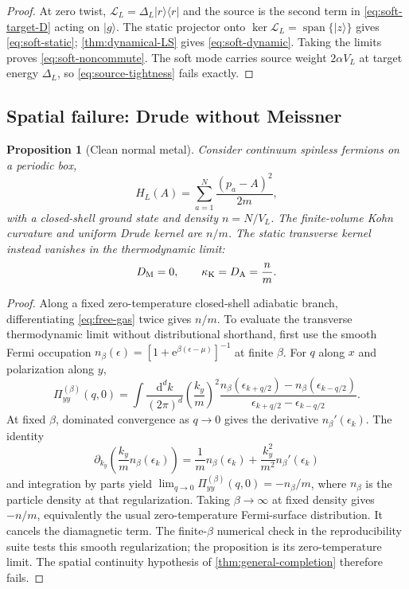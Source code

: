 \documentclass[11pt]{article}
\newtheorem{proposition}[theorem]{Proposition}
\theoremstyle{definition}
\theoremstyle{remark}
\newcommand{\cL}{\mathcal L}
\newcommand{\Span}{\operatorname{span}}
\newcommand{\dd}{\mathrm d}
\newcommand{\e}{\mathrm e}
\newcommand{\ket}[1]{\lvert #1\rangle}
\newcommand{\bra}[1]{\langle #1\rvert}
\begin{document}
\begin{proof}
At zero twist,
$\cL_L=\Delta_L\ket r\bra r$ and the source is the second term in
\eqref{eq:soft-target-D} acting on $\ket g$.  The static projector onto $\ker\cL_L=\Span\{\ket z\}$
gives \eqref{eq:soft-static}; \cref{thm:dynamical-LS} gives \eqref{eq:soft-dynamic}.  Taking the limits
proves \eqref{eq:soft-noncommute}.  The soft mode carries source weight $2\alpha V_L$ at target energy
$\Delta_L$, so \eqref{eq:source-tightness} fails exactly.
\end{proof}

\subsection{Spatial failure: Drude without Meissner}

\begin{proposition}[Clean normal metal]
\label{prop:free-gas}
Consider continuum spinless fermions on a periodic box,
\begin{equation}
 H_L(A)=\sum_{a=1}^N\frac{(p_a-A)^2}{2m},
 \label{eq:free-gas}
\end{equation}
with a closed-shell ground state and density $n=N/V_L$.  The finite-volume Kohn curvature and uniform
Drude kernel are $n/m$.  The static transverse kernel instead vanishes in the thermodynamic limit:
\begin{equation}
 D_{\rm M}=0,
 \qquad
 \kappa_{\rm K}=D_{\rm A}=\frac nm.
 \label{eq:free-gas-result}
\end{equation}
\end{proposition}

\begin{proof}
Along a fixed zero-temperature closed-shell adiabatic branch, differentiating \eqref{eq:free-gas} twice
gives $n/m$.  To evaluate the transverse thermodynamic limit without distributional shorthand, first use
the smooth Fermi occupation $n_\beta(\epsilon)=[1+\e^{\beta(\epsilon-\mu)}]^{-1}$ at finite
$\beta$.  For $q$ along $x$ and polarization along $y$,
\begin{equation}
 \Pi_{yy}^{(\beta)}(q,0)
 =\int\frac{\dd^dk}{(2\pi)^d}
 \left(\frac{k_y}{m}\right)^2
 \frac{n_\beta(\epsilon_{k+q/2})-n_\beta(\epsilon_{k-q/2})}
 {\epsilon_{k+q/2}-\epsilon_{k-q/2}}.
\end{equation}
At fixed $\beta$, dominated convergence as $q\to0$ gives the derivative
$n_\beta'(\epsilon_k)$.  The identity
\begin{equation}
 \partial_{k_y}\!\left(\frac{k_y}{m}n_\beta(\epsilon_k)\right)
 =\frac1m n_\beta(\epsilon_k)+\frac{k_y^2}{m^2}n_\beta'(\epsilon_k)
\end{equation}
and integration by parts yield
$\lim_{q\to0}\Pi_{yy}^{(\beta)}(q,0)=-n_\beta/m$, where $n_\beta$ is the particle density at that
regularization.  Taking $\beta\to\infty$ at fixed density gives $-n/m$, equivalently the usual
zero-temperature Fermi-surface distribution.  It cancels the diamagnetic term.  The finite-$\beta$
numerical check in the reproducibility suite tests this smooth regularization; the proposition is its
zero-temperature limit.  The spatial continuity hypothesis of \cref{thm:general-completion} therefore
fails.
\end{proof}
\end{document}
